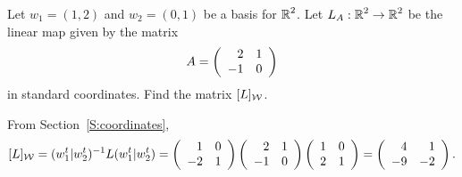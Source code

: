 \documentclass{ximera}
\begin{document}
\begin{exercise} \label{c7.3.1}
Let $w_1=(1,2)$ and $w_2=(0,1)$ be a basis for $\mbox{$\Bbb{R}$}^2$.  Let
$L_A:\mbox{$\Bbb{R}$}^2\to\mbox{$\Bbb{R}$}^2$ be the linear map given by the matrix
\[
A=\left(\begin{array}{rr} 2 & 1\\ -1 &0\end{array}\right)
\]
in standard coordinates.  Find the matrix $[L]_{\cal W}$.

\begin{solution}

\soln From Section~\ref{S:coordinates},
\[
[L]_{\cal W} = (w_1^t|w_2^t)^{-1}L(w_1^t|w_2^t) =
\left(\begin{array}{rr} 1 & 0\\ -2 &1\end{array}\right)\left(\begin{array}{rr} 2 & 1\\ -1 &0\end{array}\right)\left(\begin{array}{rr} 1 & 0\\ 2 &1\end{array}\right) =
\left(\begin{array}{rr} 4 & 1\\ -9 &-2\end{array}\right).
\]

\end{solution}
\end{exercise}
\end{document}
